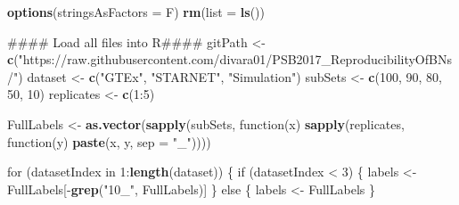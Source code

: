 \documentclass[]{article}
\newenvironment{Shaded}{\begin{snugshade}}{\end{snugshade}}
\newcommand{\KeywordTok}[1]{\textcolor[rgb]{0.13,0.29,0.53}{\textbf{{#1}}}}
\newcommand{\DataTypeTok}[1]{\textcolor[rgb]{0.13,0.29,0.53}{{#1}}}
\newcommand{\DecValTok}[1]{\textcolor[rgb]{0.00,0.00,0.81}{{#1}}}
\newcommand{\StringTok}[1]{\textcolor[rgb]{0.31,0.60,0.02}{{#1}}}
\newcommand{\NormalTok}[1]{{#1}}
\begin{document}
\begin{Shaded}
\begin{Highlighting}[]
\KeywordTok{options}\NormalTok{(}\DataTypeTok{stringsAsFactors =} \NormalTok{F)}
\KeywordTok{rm}\NormalTok{(}\DataTypeTok{list =} \KeywordTok{ls}\NormalTok{())}

\NormalTok{#### Load all files into R####}
\NormalTok{gitPath <-}\StringTok{ }\KeywordTok{c}\NormalTok{(}\StringTok{"https://raw.githubusercontent.com/divara01/PSB2017_ReproducibilityOfBNs/"}\NormalTok{)}
\NormalTok{dataset <-}\StringTok{ }\KeywordTok{c}\NormalTok{(}\StringTok{"GTEx"}\NormalTok{, }\StringTok{"STARNET"}\NormalTok{, }\StringTok{"Simulation"}\NormalTok{)}
\NormalTok{subSets <-}\StringTok{ }\KeywordTok{c}\NormalTok{(}\DecValTok{100}\NormalTok{, }\DecValTok{90}\NormalTok{, }\DecValTok{80}\NormalTok{, }\DecValTok{50}\NormalTok{, }\DecValTok{10}\NormalTok{)}
\NormalTok{replicates <-}\StringTok{ }\KeywordTok{c}\NormalTok{(}\DecValTok{1}\NormalTok{:}\DecValTok{5}\NormalTok{)}

\NormalTok{FullLabels <-}\StringTok{ }\KeywordTok{as.vector}\NormalTok{(}\KeywordTok{sapply}\NormalTok{(subSets, function(x) }\KeywordTok{sapply}\NormalTok{(replicates, }
    \NormalTok{function(y) }\KeywordTok{paste}\NormalTok{(x, y, }\DataTypeTok{sep =} \StringTok{"_"}\NormalTok{))))}

\NormalTok{for (datasetIndex in }\DecValTok{1}\NormalTok{:}\KeywordTok{length}\NormalTok{(dataset)) \{}
    \NormalTok{if (datasetIndex <}\StringTok{ }\DecValTok{3}\NormalTok{) \{}
        \NormalTok{labels <-}\StringTok{ }\NormalTok{FullLabels[-}\KeywordTok{grep}\NormalTok{(}\StringTok{"10_"}\NormalTok{, FullLabels)]}
    \NormalTok{\} else \{}
        \NormalTok{labels <-}\StringTok{ }\NormalTok{FullLabels}
    \NormalTok{\}}
    

\end{Highlighting}
\end{Shaded}
\end{document}
